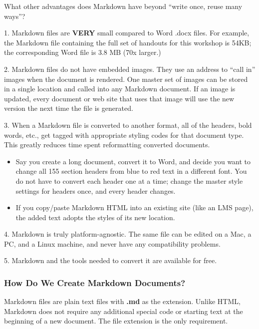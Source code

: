 \documentclass[
]{article}
\providecommand{\tightlist}{%
  \setlength{\itemsep}{0pt}\setlength{\parskip}{0pt}}
\begin{document}
What other advantages does Markdown have beyond ``write once, reuse many
ways''?

1. Markdown files are \textbf{VERY} small compared to Word .docx files.
For example, the Markdown file containing the full set of handouts for
this workshop is 54KB; the corresponding Word file is 3.8 MB (70x
larger.)

2. Markdown files do not have embedded images. They use an address to
``call in'' images when the document is rendered. One master set of
images can be stored in a single location and called into any Markdown
document. If an image is updated, every document or web site that uses
that image will use the new version the next time the file is generated.

3. When a Markdown file is converted to another format, all of the
headers, bold words, etc., get tagged with appropriate styling codes for
that document type. This greatly reduces time spent reformatting
converted documents.

\begin{itemize}
\tightlist
\item
  Say you create a long document, convert it to Word, and decide you
  want to change all 155 section headers from blue to red text in a
  different font. You do not have to convert each header one at a time;
  change the master style settings for headers once, and every header
  changes.
\item
  If you copy/paste Markdown HTML into an existing site (like an LMS
  page), the added text adopts the styles of its new location.
\end{itemize}

4. Markdown is truly platform-agnostic. The same file can be edited on a
Mac, a PC, and a Linux machine, and never have any compatibility
problems.

5. Markdown and the tools needed to convert it are available for free.

\hypertarget{how-do-we-create-markdown-documents}{%
\subsubsection{How Do We Create Markdown
Documents?}\label{how-do-we-create-markdown-documents}}

Markdown files are plain text files with \textbf{.md} as the extension.
Unlike HTML, Markdown does not require any additional special code or
starting text at the beginning of a new document. The file extension is
the only requirement.
\end{document}
